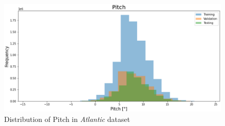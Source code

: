 \begin{figure}[h]
\centering
\includegraphics[width = \hsize]{figures/distributions/atlantic-Pitch.png}
\caption{Distribution of Pitch in \textit{Atlantic} dataset \cite{charles}}
\label{fig:atlantic-tws}
\end{figure}

